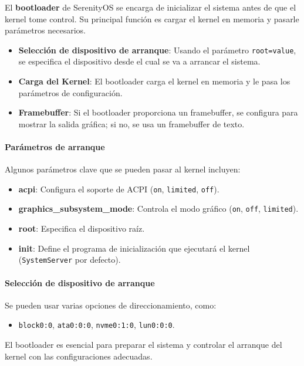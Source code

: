 El \textbf{bootloader} de SerenityOS se encarga de inicializar el sistema antes de que el kernel tome control. Su principal función es cargar el kernel en memoria y pasarle parámetros necesarios.

\begin{itemize}
  \item \textbf{Selección de dispositivo de arranque}: Usando el parámetro \texttt{root={value}}, se especifica el dispositivo desde el cual se va a arrancar el sistema.
  \item \textbf{Carga del Kernel}: El bootloader carga el kernel en memoria y le pasa los parámetros de configuración.
  \item \textbf{Framebuffer}: Si el bootloader proporciona un framebuffer, se configura para mostrar la salida gráfica; si no, se usa un framebuffer de texto.
\end{itemize}

\paragraph{Parámetros de arranque}

Algunos parámetros clave que se pueden pasar al kernel incluyen:
\begin{itemize}
  \item \textbf{acpi}: Configura el soporte de ACPI (\texttt{on}, \texttt{limited}, \texttt{off}).
  \item \textbf{graphics\_subsystem\_mode}: Controla el modo gráfico (\texttt{on}, \texttt{off}, \texttt{limited}).
  \item \textbf{root}: Especifica el dispositivo raíz.
  \item \textbf{init}: Define el programa de inicialización que ejecutará el kernel (\texttt{SystemServer} por defecto).
\end{itemize}

\paragraph{Selección de dispositivo de arranque}

Se pueden usar varias opciones de direccionamiento, como:
\begin{itemize}
  \item \texttt{block0:0}, \texttt{ata0:0:0}, \texttt{nvme0:1:0}, \texttt{lun0:0:0}.
\end{itemize}

El bootloader es esencial para preparar el sistema y controlar el arranque del kernel con las configuraciones adecuadas.



